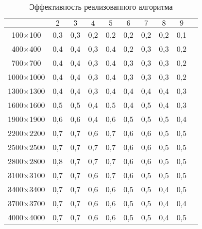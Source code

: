 \documentclass[14pt,a4paper]{extarticle} %
\begin{document}
\begin{table}[h!] 
\caption{Эффективность реализованного алгоритма}
\centering
 \begin{tabular}{|c|c|c|c|c|c|c|c|c|c|}\hline
              &$2$ &$3$ &$4$ &$5$ &$6$ &$7$ &$8$  &$9$    \\ \hline
100$\times$100   &0,3 &0,3 &0,2 &0,2 &0,2 &0,2 &0,2 &0,1  \\ \hline
400$\times$400   &0,4 &0,4 &0,3 &0,4 &0,2 &0,3 &0,3 &0,2  \\ \hline
700$\times$700   &0,4 &0,4 &0,3 &0,4 &0,3 &0,3 &0,3 &0,2  \\ \hline
1000$\times$1000 &0,4 &0,4 &0,3 &0,4 &0,3 &0,3 &0,3 &0,2  \\ \hline
1300$\times$1300 &0,4 &0,4 &0,3 &0,4 &0,4 &0,4 &0,4 &0,3  \\ \hline
1600$\times$1600 &0,5 &0,5 &0,4 &0,5 &0,4 &0,5 &0,4 &0,3  \\ \hline
1900$\times$1900 &0,6 &0,6 &0,4 &0,6 &0,5 &0,5 &0,5 &0,4  \\ \hline
2200$\times$2200 &0,7 &0,7 &0,6 &0,7 &0,6 &0,6 &0,5 &0,5  \\ \hline
2500$\times$2500 &0,7 &0,7 &0,7 &0,7 &0,6 &0,6 &0,5 &0,5  \\ \hline
2800$\times$2800 &0,8 &0,7 &0,7 &0,7 &0,6 &0,6 &0,5 &0,5  \\ \hline
3100$\times$3100 &0,7 &0,7 &0,6 &0,7 &0,6 &0,5 &0,5 &0,5  \\ \hline
3400$\times$3400 &0,7 &0,7 &0,6 &0,6 &0,5 &0,5 &0,4 &0,5  \\ \hline
3700$\times$3700 &0,7 &0,7 &0,6 &0,6 &0,5 &0,5 &0,4 &0,4  \\ \hline
4000$\times$4000 &0,7 &0,7 &0,6 &0,6 &0,5 &0,5 &0,4 &0,5  \\ \hline

\end{tabular}

\label{tab:exp3-ef-1}
\end{table}
\end{document}
